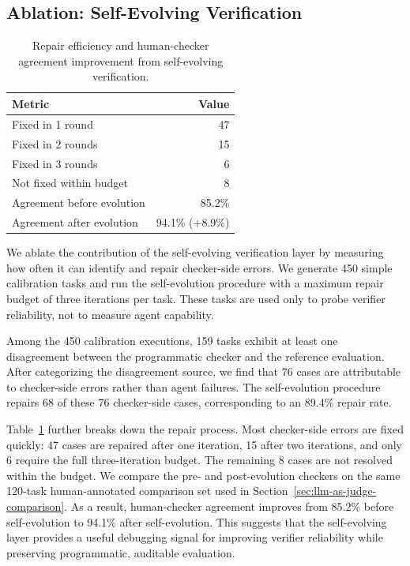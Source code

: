 \documentclass{llmxive}
\begin{document}
\subsection{Ablation: Self-Evolving Verification}
\begin{table}[t]
\vspace{-1.3em}
\centering
\small
\setlength{\tabcolsep}{3pt}
\vspace{-0.5em}
\label{tab:self_evolution_rounds}
\begin{tabular}{lr}
\toprule
Metric & Value \\
\midrule
Fixed in 1 round & 47 \\
Fixed in 2 rounds & 15 \\
Fixed in 3 rounds & 6 \\
Not fixed within budget & 8 \\
\midrule
Agreement before evolution & 85.2\% \\
Agreement after evolution & 94.1\% (+8.9\%) \\
\bottomrule
\end{tabular}
\vspace{-1.0em}

\caption{Repair efficiency and human-checker agreement improvement from self-evolving verification.}
\end{table}
We ablate the contribution of the self-evolving verification layer by measuring how often it can
identify and repair checker-side errors. We generate 450 simple calibration tasks and run the
self-evolution procedure with a maximum repair budget of three iterations per task. These tasks are
used only to probe verifier reliability, not to measure agent capability.

Among the
450 calibration executions, 159 tasks exhibit at least one disagreement between the programmatic
checker and the reference evaluation. After categorizing the disagreement source, we find that
76 cases are attributable to checker-side errors rather than agent failures.
The self-evolution procedure repairs 68 of these 76 checker-side cases, corresponding to an 89.4\%
repair rate.

Table~\ref{tab:self_evolution_rounds} further breaks down the repair process. Most checker-side
errors are fixed quickly: 47 cases are repaired after one iteration, 15 after two iterations, and only
6 require the full three-iteration budget. The remaining 8 cases are not resolved within the budget.
We compare the pre- and post-evolution checkers on the
same 120-task human-annotated comparison set used in
Section~\ref{sec:llm-as-judge-comparison}. As a result, human-checker agreement improves from 85.2\% before self-evolution to 94.1\% after
self-evolution. This suggests that the self-evolving layer provides a useful debugging signal for
improving verifier reliability while preserving programmatic, auditable evaluation.
\end{document}
